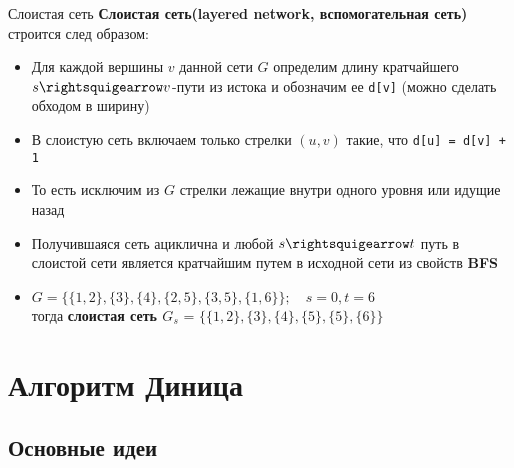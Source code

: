 \documentclass{beamer}
\begin{document}
\begin{frame}{Слоистая сеть}
\textbf{Слоистая сеть(layered network, вспомогательная сеть)} строится след образом:
    \begin{itemize}
        \item {
            Для каждой вершины $v$ данной сети $G$ определим длину кратчайшего $s \rightsquigearrow v$-пути из истока и обозначим ее \texttt{d[v]} (можно сделать обходом в ширину)
        }
        \item {
            В слоистую сеть включаем только стрелки $(u, v)$ такие, что \texttt{d[u] = d[v] + 1}
        }
        \item {
            То есть исключим из $G$ стрелки лежащие внутри одного уровня или идущие назад
        }
        \item {
            Получившаяся сеть ациклична и любой $s \rightsquigearrow t$ путь в слоистой сети является кратчайшим путем в исходной сети из свойств \textbf{BFS}
        }
        \item {
         $ G = \{\{1, 2\}, \{3\}, \{4\}, \{2, 5\}, \{3, 5\}, \{1, 6\}\}; \quad s = 0, t = 6$
         \\тогда \textbf{слоистая сеть $G_{s}$} =          $\{\{1, 2\}, \{3\}, \{4\}, \{5\}, \{5\}, \{6\}\}$
         }
    \end{itemize}
\end{frame}

\section{Алгоритм Диница}

\subsection{Основные идеи}
\end{document}
